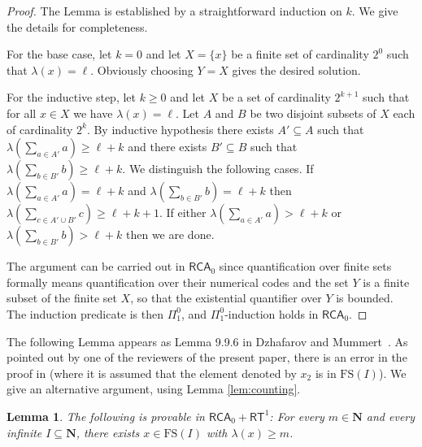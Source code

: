 \documentclass[a4paper,11pt]{article}
\newtheorem{lemma}{Lemma}
\newcommand\Nat{\mathbf{N}}
\newcommand\RCA{\mathsf{RCA}}
\newcommand\RT{\mathsf{RT}}
\newcommand\FS{\mathrm{FS}}
\begin{document}
\begin{proof}
The Lemma is established by a straightforward induction on $k$. We give the details for completeness.

For the base case, let $k=0$ and let $X=\{x\}$ be a finite set of cardinality $2^0$ such that $\lambda(x) = \ell$.
Obviously choosing $Y=X$ gives the desired solution.


For the inductive step, let $k\geq 0$ and let $X$ be a set of cardinality $2^{k+1}$ such that for all $x \in X$ we have $\lambda(x)= \ell$. Let $A$ and $B$
be two disjoint subsets of $X$ each of cardinality $2^k$. By inductive hypothesis there exists $A' \subseteq A$ such that $\lambda(\sum_{a \in A'} a)\geq \ell + k$ and there exists $B'\subseteq B$
such that $\lambda(\sum_{b\in B'} b) \geq \ell + k$. We distinguish the following cases. If $\lambda(\sum_{a \in A'} a) = \ell + k$ and $\lambda(\sum_{b\in B'} b) = \ell + k$ then 
$\lambda (\sum_{ c \in A' \cup B'} c) \geq \ell + k +1$. If either $\lambda(\sum_{a \in A'} a) > \ell + k$ or $\lambda(\sum_{b\in B'} b) > \ell + k$ then we are done.

The argument can be carried out in $\RCA_0$
since quantification over finite sets formally means quantification over their numerical codes and the set $Y$ is a finite
subset of the finite set $X$, so that the existential quantifier over $Y$ is bounded. The induction predicate is 
then $\Pi^0_1$, and $\Pi^0_1$-induction holds in $\RCA_0$.
\end{proof}

The following Lemma appears as Lemma 9.9.6 in Dzhafarov and Mummert~\cite{Dza-Mum:22}. 
As pointed out by one of the reviewers of the present paper, there is an error in the 
proof in \cite{Dza-Mum:22} (where it is assumed that the element denoted by $x_2$ is in $\FS(I)$). 
We give an alternative argument, using Lemma \ref{lem:counting}.

\begin{lemma} \label{lem:apart}
The following is provable in $\RCA_0 + \RT^1$: For every $m \in \Nat$ and every infinite $I \subseteq \Nat$, 
there exists $x \in \FS(I)$ with $\lambda(x) \geq m$. 
\end{lemma}
\end{document}
